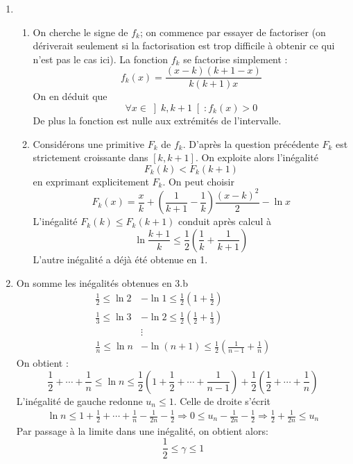 \begin{enumerate}
\item \begin{enumerate}
 \item On cherche le signe de $f_k$; on commence par essayer de factoriser (on dériverait seulement si la factorisation est trop difficile à obtenir ce qui n'est pas le cas ici). La fonction $f_k$ se factorise simplement :
\begin{displaymath}
 f_k(x)=\frac{(x-k)(k+1-x)}{k(k+1)x}
\end{displaymath}
On en déduit que 
\begin{displaymath}
 \forall x \in \left] k,k+1\right[  : f_k(x) > 0
\end{displaymath}
De plus la fonction est nulle aux extrémités de l'intervalle.
\item Considérons une primitive $F_k$ de $f_k$. D'après la question précédente $F_k$ est strictement croissante dans $[k,k+1]$. On exploite alors l'inégalité
\begin{displaymath}
 F_k(k) < F_k(k+1)
\end{displaymath}
en exprimant explicitement $F_k$. On peut choisir 
\begin{displaymath}
 F_k(x) = \frac{x}{k}+ \left( \frac{1}{k+1} -\frac{1}{k}\right)\frac{(x-k)^2}{2} -\ln x 
\end{displaymath}
L'inégalité $F_k(k)\leq F_k(k+1)$ conduit après calcul à
\begin{displaymath}
 \ln \frac{k+1}{k} \leq \frac{1}{2}(\frac{1}{k}+\frac{1}{k+1})
\end{displaymath}
L'autre inégalité a déjà été obtenue en 1.
\end{enumerate}
\item On somme les inégalités obtenues en 3.b
\begin{align*}
 \frac{1}{2} \leq \ln 2 &- \ln 1 \leq \frac{1}{2}(1+\frac{1}{2}) \\
\frac{1}{3} \leq \ln 3 &- \ln 2 \leq \frac{1}{2}(\frac{1}{2}+\frac{1}{3}) \\
 &\vdots   \\
\frac{1}{n} \leq \ln n &- \ln (n+1) \leq \frac{1}{2}(\frac{1}{n-1}+\frac{1}{n})
\end{align*}
On obtient :
\begin{displaymath}
 \frac{1}{2}+\cdots+\frac{1}{n}\leq \ln n \leq \frac{1}{2}\left( 1+\frac{1}{2}+\cdots+\frac{1}{n-1}\right) + \frac{1}{2}\left( \frac{1}{2}+\cdots+\frac{1}{n}\right) 
\end{displaymath}
L'inégalité de gauche redonne $u_n\leq 1$. Celle de droite s'écrit
\begin{multline*}
 \ln n \leq 1+\frac{1}{2}+\cdots+\frac{1}{n} -\frac{1}{2n}-\frac{1}{2}
 \Rightarrow 0 \leq u_n -\frac{1}{2n}-\frac{1}{2} 
\Rightarrow \frac{1}{2}+\frac{1}{2n} \leq u_n
\end{multline*}
Par passage à la limite dans une inégalité, on obtient alors:
\begin{displaymath}
 \frac{1}{2}\leq \gamma \leq 1
\end{displaymath}
\end{enumerate}


